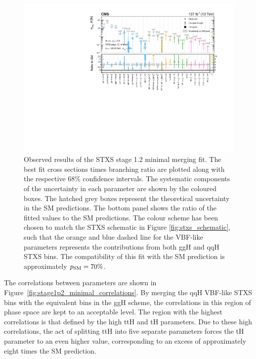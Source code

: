 \begin{figure}[htbp]
  \centering
  \includegraphics[width=1\textwidth]{Figures/hgg_results/stage1p2_minimal_summary.pdf}
  \caption[Results of the STXS stage 1.2 minimal merging fit]
  {
    Observed results of the STXS stage 1.2 minimal merging fit. The best fit cross sections times branching ratio are plotted along with the respective 68\% confidence intervals. The systematic components of the uncertainty in each parameter are shown by the coloured boxes. The hatched grey boxes represent the theoretical uncertainty in the SM predictions. The bottom panel shows the ratio of the fitted values to the SM predictions. The colour scheme has been chosen to match the STXS schematic in Figure \ref{fig:stxs_schematic}, such that the orange and blue dashed line for the VBF-like parameters represents the contributions from both ggH and qqH STXS bins. The compatibility of this fit with the SM prediction is approximately $p_{\rm{SM}}=70\%$. 
  }
  \label{fig:stage1p2_minimal_results}
\end{figure}

The correlations between parameters are shown in Figure~\ref{fig:stage1p2_minimal_correlations}. By merging the qqH VBF-like STXS bins with the equivalent bins in the ggH scheme, the correlations in this region of phase space are kept to an acceptable level. The region with the highest correlations is that defined by the high \ptH ttH and tH parameters. Due to these high correlations, the act of splitting ttH into five separate parameters forces the tH parameter to an even higher value, corresponding to an excess of approximately eight times the SM prediction. 

